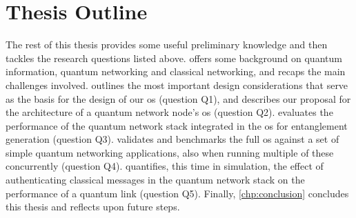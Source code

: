 \section{Thesis Outline}

The rest of this thesis provides some useful preliminary knowledge and then tackles the research
questions listed above.  offers some background on quantum information, quantum
networking and classical networking, and recaps the main challenges involved. 
outlines the most important design considerations that serve as the basis for the design of our
\acrshort{os} (question Q1), and describes our proposal for the architecture of a quantum network
node's \acrshort{os} (question Q2).  evaluates the performance of the quantum
network stack integrated in the \acrshort{os} for entanglement generation (question Q3).
 validates and benchmarks the full \acrshort{os} against a set of simple quantum
networking applications, also when running multiple of these concurrently (question Q4).
 quantifies, this time in simulation, the effect of authenticating classical messages
in the quantum network stack on the performance of a quantum link (question Q5). Finally,
\cref{chp:conclusion} concludes this thesis and reflects upon future steps.

\printbibliography[heading=subbibintoc,title={References}]
